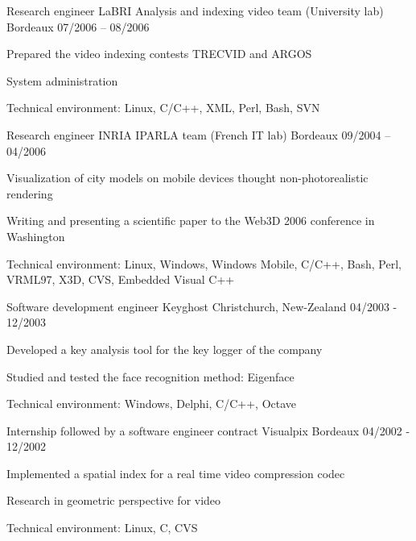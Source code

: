 \begin{cventries}
  \cventry
    {Research engineer}
    {LaBRI Analysis and indexing video team (University lab)}
    {Bordeaux}
    {07/2006 – 08/2006}
    {
      \begin{cvitems}
        \item {Prepared the video indexing contests TRECVID and ARGOS}
        \item {System administration}
        \item {Technical environment: Linux, C/C++, XML, Perl, Bash, SVN}
      \end{cvitems}
    }

  \cventry
    {Research engineer}
    {INRIA IPARLA team (French IT lab)}
    {Bordeaux}
    {09/2004 – 04/2006}
    {
      \begin{cvitems}
        \item {Visualization of city models on mobile devices thought
            non-photorealistic rendering}
        \item {Writing and presenting a scientific paper to the Web3D 2006
            conference in Washington}
        \item {Technical environment: Linux, Windows, Windows Mobile, C/C++,
            Bash, Perl, VRML97, X3D, CVS, Embedded Visual C++}
      \end{cvitems}
    }

  \cventry
    {Software development engineer}
    {Keyghost}
    {Christchurch, New-Zealand}
    {04/2003 - 12/2003}
    {
      \begin{cvitems}
        \item {Developed a key analysis tool for the key logger of the company}
        \item {Studied and tested the face recognition method: Eigenface}
		\item {Technical environment: Windows, Delphi, C/C++, Octave}
      \end{cvitems}
    }

  \cventry
    {Internship followed by a software engineer contract}
    {Visualpix}
    {Bordeaux}
    {04/2002 - 12/2002}
    {
      \begin{cvitems}
        \item {Implemented a spatial index for a real time video compression
            codec}
        \item {Research in geometric perspective for video}
		\item {Technical environment: Linux, C, CVS}
      \end{cvitems}
    }


\end{cventries}
